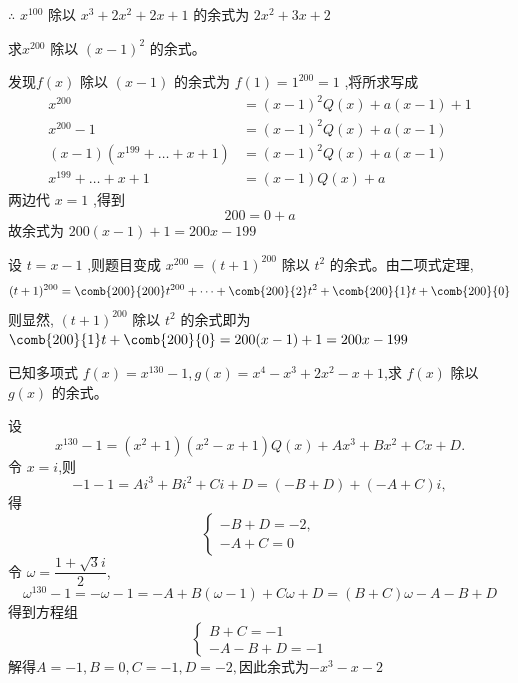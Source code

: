 \begin{questions}
\begin{solution}
        $\therefore$ $x^{100}$ 除以 $x^3 + 2 x^2 + 2 x + 1$ 的余式为 $2x^2+3x+2$ 
    \end{solution}
    
    \question 求$x^{200}$ 除以 $(x - 1)^2$ 的余式。
    \begin{solution}
        发现$f(x)$ 除以 $(x-1)$ 的余式为 $f(1)=1^{200}=1$ ,将所求写成
        \begin{align*}
        x^{200}&=(x-1)^{2}Q(x)+a(x-1)+1 \\
        x^{200}-1&=(x-1)^{2}Q(x)+a(x-1) \\
        (x-1)(x^{199}+\dots+x+1)&=(x-1)^{2}Q(x)+a(x-1) \\
        x^{199}+\dots+x+1&=(x-1)Q(x)+a
        \end{align*}
        两边代 $x=1$ ,得到
        $$200=0+a$$
        故余式为 $200(x-1)+1=200x-199$
    \end{solution}

    \begin{solution}
        设 $t=x-1$ ,则题目变成 $x^{200}=(t+1)^{200}$ 除以 $t^{2}$ 的余式。由二项式定理,
        $$(t+1)^{200}=\comb{200}{200}t^{200}+\dots+\comb{200}{2}t^{2}+\comb{200}{1}t+\comb{200}{0}$$
            则显然, $(t+1)^{200}$ 除以 $t^{2}$ 的余式即为 $\comb{200}{1}t+\comb{200}{0}=200(x-1)+1=200x-199$
    \end{solution}
    
    \question 已知多项式 $f(x)=x^{130}-1,g(x)=x^{4}-x^{3}+2x^{2}-x+1$,求 $f(x)$ 除以 $g(x)$ 的余式。
    \begin{solution}
        设
        \[
        x^{130}-1= (x^2 + 1)(x^2 - x + 1)Q(x) + Ax^3 + Bx^2 + Cx + D.
        \]
        令 $x = i$,则
        \[
        -1 - 1 = Ai^3 + Bi^2 + Ci + D = (-B + D) + (-A + C)i,
        \]
        得
        \[
        \begin{cases}
        -B + D = -2, \\
        -A + C = 0
        \end{cases}
        \]
        令 $\omega = \dfrac{1 + \sqrt{3}i}{2}$,
        \[
        \omega^{130}-1=-\omega -1=-A+B(\omega-1)+C\omega+D =(B+C)\omega-A-B+D
        \]
        得到方程组
        \[
        \begin{cases}
        B+C=-1 \\
        -A-B+D=-1
        \end{cases}
        \]
        解得$A = -1, B = 0, C = -1, D = -2,$因此余式为$-x^{3} - x - 2$
    \end{solution}


\end{questions}
